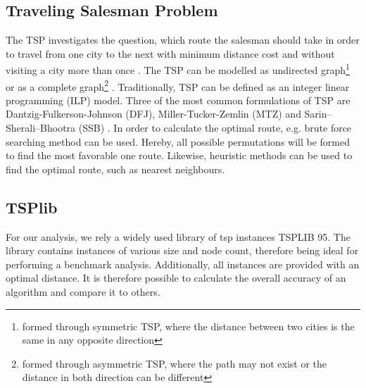 \documentclass[conference]{IEEEtran}
\begin{document}
	\subsection{Traveling Salesman Problem}
	The TSP investigates the question, which route the salesman should take in order to travel from one city to the next with minimum distance cost and without visiting a city more than once \cite{bernhard2008combinatorial, tsp2019sheridan, moustapha2016advances}. The TSP can be modelled as undirected graph\footnote{formed through symmetric TSP, where the distance between two cities is the same in any opposite direction} or as a complete graph\footnote{formed through asymmetric TSP, where the path may not exist or the distance in both direction can be different} \cite{gutin2006traveling}. 
	Traditionally, TSP can be defined as an integer linear programming (ILP) model. Three of the most common formulations of TSP are Dantzig-Fulkerson-Johnson (DFJ), Miller-Tucker-Zemlin (MTZ) and Sarin–Sherali–Bhootra (SSB) \cite{moustapha2016advances, gutin2006traveling}. 
	In order to calculate the optimal route, e.g. brute force searching method can be used. Hereby, all possible permutations will be formed to find the most favorable one route. Likewise, heuristic methods can be used to find the optimal route, such as nearest neighbours\cite{halim2019combinatorial}. 

	\subsection{TSPlib}
	For our analysis, we rely a widely used library of tsp instances TSPLIB 95\cite{tsplib2019}. The library contains instances of various size and node count, therefore being ideal for performing a benchmark analysis. Additionally, all instances are provided with an optimal distance. It is therefore possible to calculate the overall accuracy of an algorithm and compare it to others.
	
\end{document}
